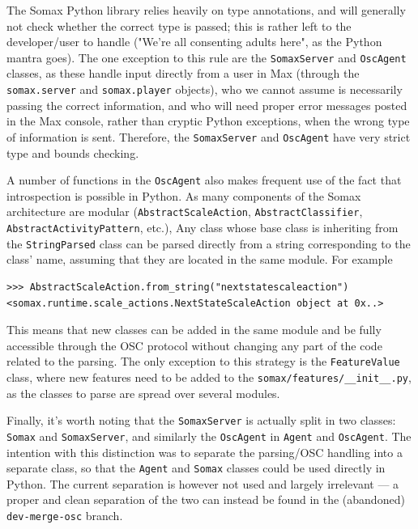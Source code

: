 The Somax Python library relies heavily on type annotations, and will generally not check whether the correct type is passed; this is rather left to the developer/user to handle ("We're all consenting adults here", as the Python mantra goes). The one exception to this rule are the \texttt{SomaxServer} and \texttt{OscAgent} classes, as these handle input directly from a user in Max (through the \texttt{somax.server} and \texttt{somax.player} objects), who we cannot assume is necessarily passing the correct information, and who will need proper error messages posted in the Max console, rather than cryptic Python exceptions, when the wrong type of information is sent. Therefore, the \texttt{SomaxServer} and \texttt{OscAgent} have very strict type and bounds checking.

A number of functions in the \texttt{OscAgent} also makes frequent use of the fact that introspection is possible in Python. As many components of the Somax architecture are modular (\texttt{AbstractScaleAction}, \texttt{AbstractClassifier}, \texttt{AbstractActivityPattern}, etc.), Any class whose base class is inheriting from the \texttt{StringParsed} class can be parsed directly from a string corresponding to the class' name, assuming that they are located in the same module. For example

\begin{lstlisting}
>>> AbstractScaleAction.from_string("nextstatescaleaction")
<somax.runtime.scale_actions.NextStateScaleAction object at 0x..>
\end{lstlisting}
This means that new classes can be added in the same module and be fully accessible through the OSC protocol without changing any part of the code related to the parsing. The only exception to this strategy is the \texttt{FeatureValue} class, where new features need to be added to the \texttt{somax/features/\_\_init\_\_.py}, as the classes to parse are spread over several modules.

Finally, it's worth noting that the \texttt{SomaxServer} is actually split in two classes: \texttt{Somax} and \texttt{SomaxServer}, and similarly the \texttt{OscAgent} in \texttt{Agent} and \texttt{OscAgent}. The intention with this distinction was to separate the parsing/OSC handling into a separate class, so that the \texttt{Agent} and \texttt{Somax} classes could be used directly in Python. The current separation is however not used and largely irrelevant — a proper and clean separation of the two can instead be found in the (abandoned) \texttt{dev-merge-osc} branch.

